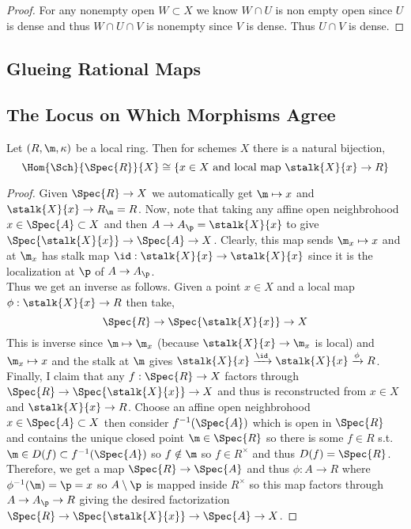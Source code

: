 \documentclass[12pt]{article}
\begin{document}
\begin{proof}
For any nonempty open $W \subset X$ we know $W \cap U$ is non empty open since $U$ is dense and thus $W \cap U \cap V$ is nonempty since $V$ is dense. Thus $U \cap V$ is dense. 
\end{proof}

\subsection{Glueing Rational Maps}

\subsection{The Locus on Which Morphisms Agree}

\begin{lemma}
Let $(R, \m, \kappa)$ be a local ring. Then for schemes $X$ there is a natural bijection,
\[ \Hom{\Sch}{\Spec{R}}{X} \cong \{ x \in X \text{ and local map } \stalk{X}{x} \to R \} \]
\end{lemma}

\begin{proof}
Given $\Spec{R} \to X$ we automatically get $\m \mapsto x$ and $\stalk{X}{x} \to R_\m = R$. 
Now, note that taking any affine open neighbrohood $x \in \Spec{A} \subset X$ and then $A \to A_\p = \stalk{X}{x}$ to give $\Spec{\stalk{X}{x}} \to \Spec{A} \to X$. Clearly, this map sends $\m_x \mapsto x$ and at $\m_x$ has stalk map $\id : \stalk{X}{x} \to \stalk{X}{x}$ since it is the localization at $\p$ of $A \to A_\p$. 
\bigskip\\
Thus we get an inverse as follows. Given a point $x \in X$ and a local map $\phi : \stalk{X}{x} \to R$ then take,
\[ \Spec{R} \to \Spec{\stalk{X}{x}} \to X \]
This is inverse since $\m \mapsto \m_x$ (because $\stalk{X}{x} \to \m_x$ is local) and $\m_x \mapsto x$ and the stalk at $\m$ gives $\stalk{X}{x} \xrightarrow{\id} \stalk{X}{x} \xrightarrow{\phi} R$. 
\bigskip\\
Finally, I claim that any $f : \Spec{R} \to X$ factors through $\Spec{R} \to \Spec{\stalk{X}{x}} \to X$ and thus is reconstructed from $x \in X$ and $\stalk{X}{x} \to R$. Choose an affine open neighbrohood $x \in \Spec{A} \subset X$ then consider $f^{-1}(\Spec{A})$ which is open in $\Spec{R}$ and contains the unique closed point $\m \in \Spec{R}$ so there is some $f \in R$ s.t. $\m \in D(f) \subset f^{-1}(\Spec{A})$ so $f \notin \m$ so $f \in R^\times$ and thus $D(f) = \Spec{R}$. Therefore, we get a map $\Spec{R} \to \Spec{A}$ and thus $\phi : A \to R$ where $\phi^{-1}(\m) = \p = x$ so $A \setminus \p$ is mapped inside $R^\times$ so this map factors through $A \to A_\p \to R$ giving the desired factorization $\Spec{R} \to \Spec{\stalk{X}{x}} \to \Spec{A} \to X$.  
\end{proof}
\end{document}
